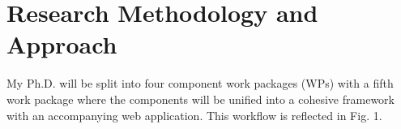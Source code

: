 \documentclass[runningheads]{llncs}
\begin{document}
\section{Research Methodology and Approach}

My Ph.D. will be split into four component work packages (WPs) with a fifth work package where the components will be unified into a cohesive framework with an accompanying web application. This workflow is reflected in Fig. 1.
\end{document}
